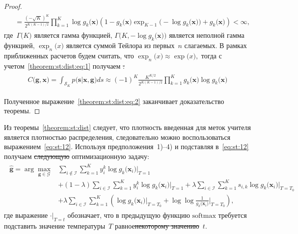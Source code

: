 \documentclass[12pt]{a&t}
\providecommand{\DIFdel}[1]{{\protect\color{red}\sout{#1}}}                      %
\providecommand{\DIFdelbegin}{} %
\providecommand{\DIFdelend}{} %
\newcommand{\DIFscaledelfig}{0.5}
\newlength{\DIFdelgraphicswidth} %
\newlength{\DIFdelgraphicsheight} %
\newcommand{\DIFdelincludegraphics}[2][]{%
\sbox{\DIFdelgraphicsbox}{\DIFOincludegraphics[#1]{#2}}%
\settoboxwidth{\DIFdelgraphicswidth}{\DIFdelgraphicsbox} %
\settoboxtotalheight{\DIFdelgraphicsheight}{\DIFdelgraphicsbox} %
\scalebox{\DIFscaledelfig}{%
\parbox[b]{\DIFdelgraphicswidth}{\usebox{\DIFdelgraphicsbox}\\[-\baselineskip] \rule{\DIFdelgraphicswidth}{0em}}\llap{\resizebox{\DIFdelgraphicswidth}{\DIFdelgraphicsheight}{%
\setlength{\unitlength}{\DIFdelgraphicswidth}%
\begin{picture}(1,1)%
\thicklines\linethickness{2pt} %
{\color[rgb]{1,0,0}\put(0,0){\framebox(1,1){}}}%
{\color[rgb]{1,0,0}\put(0,0){\line( 1,1){1}}}%
{\color[rgb]{1,0,0}\put(0,1){\line(1,-1){1}}}%
\end{picture}%
}\hspace*{3pt}}} %
} %
\DeclareRobustCommand{\DIFdelbegin}{\DIFOdelbegin \let\includegraphics\DIFdelincludegraphics} %
\DeclareRobustCommand{\DIFdelend}{\DIFOaddend \let\includegraphics\DIFOincludegraphics} %
\begin{document}
\begin{proof}
\begin{gather}
\begin{aligned}
		& = \frac{\left(-\sqrt{K}\right)^K}{2^{K(K-1)/2}}\prod_{k=1}^{K}\log g_k\bigr(\mathbf{x}\bigr)\left(1 -g_k\bigr(\mathbf{x}\bigr) \exp_{K-1}\bigr(-\log g_k\bigr(\mathbf{x}\bigr)\bigr)+g_k\bigr(\mathbf{x}\bigr)\right) < \infty,
	\end{aligned}
	\end{gather}
где~$\Gamma\bigr(K\bigr)$ является гамма функцией, $\Gamma\bigr(K, -\log g_k\bigr(\mathbf{x}\bigr)\bigr)$ является неполной гамма функцией, $\exp_{n}\bigr(x\bigr)$ является суммой Тейлора из первых~$n$ слагаемых. В рамках приближенных расчетов будем считать, что $\exp_{n}\bigr(x\bigr)\approx\exp\bigr(x\bigr),$ тогда с учетом~\eqref{theorem:st:dist:eq:1} получаем
	\DIFdelbegin \DIFdel{:
	}\DIFdelend \begin{gather}
	\label{theorem:st:dist:eq:2}
	\begin{aligned}
		C\bigr(\mathbf{g}, \mathbf{x}\bigr) = \int_{\mathcal{S}_K}p\bigr(\mathbf{s}|\mathbf{x}, \mathbf{g}\bigr)ds \approx \left(-1\right)^{K}\frac{K^{K/2}}{2^{K(K-1)/2}}\prod_{k=1}^{K}g_k\bigr(\mathbf{x}\bigr)\log g_k\bigr(\mathbf{x}\bigr)
	\end{aligned}
	\end{gather}
\DIFdelbegin %

\DIFdelend Полученное выражение~\eqref{theorem:st:dist:eq:2} заканчивает доказательство теоремы.
\end{proof}

Из теоремы~\ref{theorem:st:dist} следует, что плотность введенная для меток учителя является плотностью распределения, следовательно можно воспользоваться выражением~\eqref{eq:st:12}.
Используя предположения~1)--4) и подставляя в~\eqref{eq:st:12} получаем  \DIFdelbegin \DIFdel{следующую }\DIFdelend оптимизационную задачу:
\begin{gather}
\label{eq:st:class:1}
\begin{aligned}
\hat{\mathbf{g}} = \arg\max_{\mathbf{g}\in \mathcal{G}} & \sum_{i\not\in \mathcal{I}}\sum_{k=1}^{K}y_i^k\log g_k\bigr(\mathbf{x}_i\bigr)\bigr|_{T=1} \\
&+ \left(1-\lambda\right)\sum_{i\in \mathcal{I}}\sum_{k=1}^{K}y_i^k\log g_k\bigr(\mathbf{x}_i\bigr)\bigr|_{T=1} + \lambda\sum_{i\in \mathcal{I}}\sum_{k=1}^{K}s_{i,k}\log g_k\bigr(\mathbf{x}_i\bigr)\bigr|_{T=T_0} \\
&+ \lambda \sum_{i\in \mathcal{I}}\sum_{k=1}^{K}\left(\log g_k\bigr(\mathbf{x}_i\bigr)\bigr|_{T=T_0} + \log\log\frac{1}{g_k\bigr(\mathbf{x}_i\bigr)}\bigr|_{T=T_0}\right),
\end{aligned}
\end{gather}
где выражение $\cdot\bigr|_{T=t}$ обозначает, что в предыдущую функцию $\text{softmax}$ требуется подставить значение температуры~$T$ равное\DIFdelbegin \DIFdel{некоторому значению}\DIFdelend ~$t$.
\end{document}
